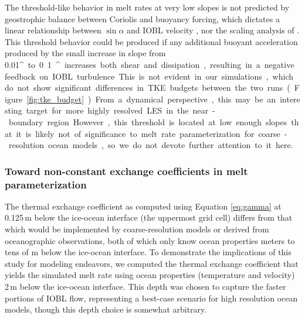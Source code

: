 \documentclass[tc, manuscript]{copernicus}
\begin{document}
The threshold-like behavior in melt rates at very low slopes is not predicted by geostrophic balance between Coriolis and buoyancy forcing, which dictates a linear relationship between $\sin\alpha$ and IOBL velocity \citep{jenkins_simple_2016}, nor the scaling analysis of \citet{magorrian_turbulent_2016}. This threshold behavior could be produced if any additional buoyant acceleration produced by the small increase in slope from 0.01\unit{^{\circ}} to 0.1\unit{^{\circ}} increases both shear and dissipation, resulting in a negative feedback on IOBL turbulence. This is not evident in our simulations, which do not show significant differences in TKE budgets between the two runs (Figure \ref{fig:tke_budget}). From a dynamical perspective, this may be an interesting target for more highly resolved LES in the near-boundary region. However, this threshold is located at low enough slopes that it is likely not of significance to melt rate parameterization for coarse-resolution ocean models, so we do not devote further attention to it here. 


\subsubsection{Toward non-constant exchange coefficients in melt parameterization}\label{disc:prm_gamma}

The thermal exchange coefficient as computed using Equation \ref{eq:gamma} at 0.125\,\unit{m} below the ice-ocean interface (the uppermost grid cell) differs from that which would be implemented by coarse-resolution models or derived from oceanographic observations, both of which only know ocean properties meters to tens of \unit{m} below the ice-ocean interface. To demonstrate the implications of this study for modeling endeavors, we computed the thermal exchange coefficient that yields the simulated melt rate using ocean properties (temperature and velocity) 2\,\unit{m} below the ice-ocean interface. This depth was chosen to capture the faster portions of IOBL flow, representing a best-case scenario for high resolution ocean models, though this depth choice is somewhat arbitrary. 
\end{document}
